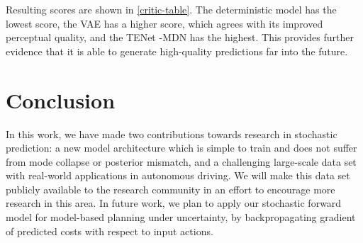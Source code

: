 \documentclass{article}
\newcommand{\modelname}{TENet }
\begin{document}
Resulting scores are shown in \cref{critic-table}.
The deterministic model has the lowest score, the VAE has a higher score, which agrees with its improved perceptual quality, and the \modelname-MDN has the highest.
This provides further evidence that it is able to generate high-quality predictions far into the future.

\section{Conclusion}

In this work, we have made two contributions towards research in stochastic prediction: a new model architecture which is simple to train and does not suffer from mode collapse or posterior mismatch, and a challenging large-scale data set with real-world applications in autonomous driving.
We will make this data set publicly available to the research community in an effort to encourage more research in this area.
In future work, we plan to apply our stochastic forward model for model-based planning under uncertainty, by backpropagating gradient of predicted costs with respect to input actions.

%
%
%
%
%
%
\end{document}
